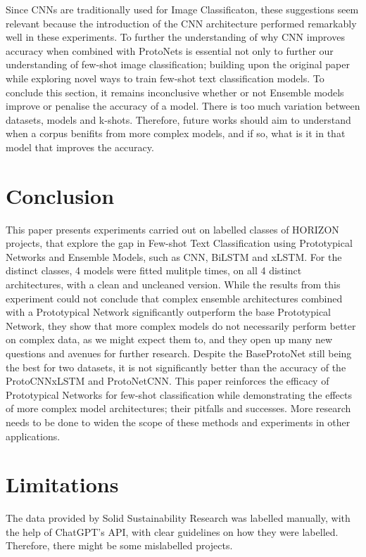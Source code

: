 \documentclass[letterpaper]{article} %
\begin{document}
Since CNNs are traditionally used for Image Classificaton, these suggestions seem relevant because the introduction of the CNN architecture performed remarkably well in these experiments. To further the understanding of why CNN improves accuracy when combined with ProtoNets is essential not only to further our understanding of
 few-shot image classification; building upon the original paper while exploring novel ways to train few-shot text classification models. 
To conclude this section, it remains inconclusive whether or not Ensemble models improve or penalise the accuracy of a model. There is too much variation between datasets, models and k-shots. Therefore, future works should aim to understand when a corpus benifits from more complex models, and if so, what is it in that model that improves the accuracy. 

\section{Conclusion}

This paper presents experiments carried out on labelled classes of HORIZON projects, that explore the gap in Few-shot Text Classification using Prototypical Networks and Ensemble Models, such as CNN, BiLSTM and xLSTM.
For the distinct classes, 4 models were fitted mulitple times, on all 4 distinct architectures, with a clean and uncleaned version.
While the results from this experiment could not conclude that complex ensemble architectures combined with a Prototypical Network significantly outperform the base Prototypical Network, they show that more complex models do not necessarily perform better on complex data, as we might expect them to, and they open up many new questions and avenues for further research.
Despite the BaseProtoNet still being the best for two datasets, it is not significantly better than the accuracy of the ProtoCNNxLSTM and ProtoNetCNN.
This paper reinforces the efficacy of Prototypical Networks for few-shot classification while demonstrating the effects of more complex model architectures; their pitfalls and successes.
More research needs to be done to widen the scope of these methods and experiments in other applications.

\section{Limitations}

The data provided by Solid Sustainability Research was labelled manually, with the help of ChatGPT's API, with clear guidelines on how they were labelled. \cite{pereira2025classifying}
Therefore, there might be some mislabelled projects.
\end{document}
